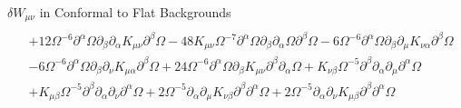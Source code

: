 \documentclass[8pt,aspectratio=1610]{beamer}
\begin{document}
\begin{frame}{$\delta W_{\mu\nu}$ in Conformal to Flat Backgrounds}
{\begin{align}
		\nonumber\\
		& + 12 \Omega^{-6} \partial^{\alpha}\Omega \partial_{\beta}\partial_{\alpha}K_{\mu \nu} \partial^{\beta}\Omega - 48 K_{\mu \nu} \Omega^{-7} \partial^{\alpha}\Omega \partial_{\beta}\partial_{\alpha}\Omega \partial^{\beta}\Omega - 6 \Omega^{-6} \partial^{\alpha}\Omega \partial_{\beta}\partial_{\mu}K_{\nu \alpha} \partial^{\beta}\Omega
		\nonumber\\
		& - 6 \Omega^{-6} \partial^{\alpha}\Omega \partial_{\beta}\partial_{\nu}K_{\mu \alpha} \partial^{\beta}\Omega
		+ 24 \Omega^{-6} \partial^{\alpha}\Omega \partial_{\beta}K_{\mu \nu} \partial^{\beta}\partial_{\alpha}\Omega + K_{\nu \beta} \Omega^{-5} \partial^{\beta}\partial_{\alpha}\partial_{\mu}\partial^{\alpha}\Omega 
		\nonumber\\
		&+ K_{\mu \beta} \Omega^{-5} \partial^{\beta}\partial_{\alpha}\partial_{\nu}\partial^{\alpha}\Omega + 2 \Omega^{-5} \partial_{\alpha}\partial_{\mu}K_{\nu \beta} \partial^{\beta}\partial^{\alpha}\Omega + 2 \Omega^{-5} \partial_{\alpha}\partial_{\nu}K_{\mu \beta} \partial^{\beta}\partial^{\alpha}\Omega 
		\nonumber
		\end{align}
	}
\end{frame}
\end{document}
